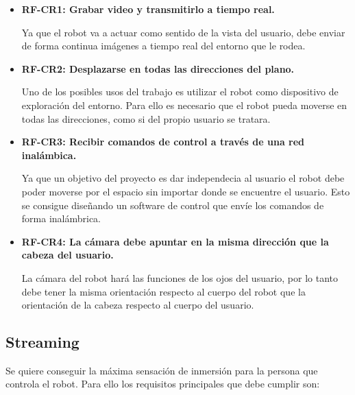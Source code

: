 \documentclass[twoside, 11pt]{epstfg}
\begin{document}
\begin{itemize}
	\item \textbf{RF-CR1: Grabar video y transmitirlo a tiempo real.}
	
	 Ya que el robot va a actuar como sentido de la vista del usuario, debe enviar de forma continua imágenes a tiempo real del entorno que le rodea.
	
	
	\item\textbf{RF-CR2: Desplazarse en todas las direcciones del plano.} 
	
	Uno de los posibles usos del trabajo es utilizar el robot como dispositivo de exploración del entorno. Para ello es necesario que el robot pueda moverse en todas las direcciones, como si del propio usuario se tratara.
	
	
	\item\textbf{RF-CR3: Recibir comandos de control a través de una red inalámbica.}
	
	Ya que un objetivo del proyecto es dar independecia al usuario el robot debe poder moverse por el espacio sin importar donde se encuentre el usuario. Esto se consigue diseñando un software de control que envíe los comandos de forma inalámbrica.
	
	
	\item\textbf{RF-CR4: La cámara debe apuntar en la misma dirección que la cabeza del usuario.} \label{RF-CR4} 
	
	La cámara del robot hará las funciones de los ojos del usuario, por lo tanto debe tener la misma orientación respecto al cuerpo del robot que la orientación de la cabeza respecto al cuerpo del usuario.
\end{itemize}



\subsection{Streaming}
Se quiere conseguir la máxima sensación de inmersión para la persona que controla el robot.
Para ello los requisitos principales que debe cumplir son:
\end{document}
